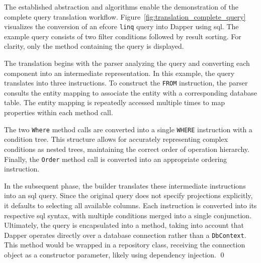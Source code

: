 \FloatBarrier
\begin{example}
\small

The established abstraction and algorithms enable the demonstration of the complete query translation workflow. Figure~\ref{fig:translation_complete_query} visualizes the conversion of an \acrshort{efcore} \texttt{linq} query into Dapper using \acrshort{sql}. The example query consists of two filter conditions followed by result sorting. For clarity, only the method containing the query is displayed. 

The translation begins with the parser analyzing the query and converting each component into an intermediate representation. In this example, the query translates into three instructions. To construct the \texttt{FROM} instruction, the parser consults the entity mapping to associate the entity with a corresponding database table. The entity mapping is repeatedly accessed multiple times to map  properties within each method call.

The two \texttt{Where} method calls are converted into a single \texttt{WHERE} instruction with a condition tree. This structure allows for accurately representing complex conditions as nested trees, maintaining the correct order of operation hierarchy. Finally, the \texttt{Order} method call is converted into an appropriate ordering instruction.

In the subsequent phase, the builder translates these intermediate instructions into an \acrshort{sql} query. Since the original query does not specify projections explicitly, it defaults to selecting all available columns. Each instruction is converted into its respective \acrshort{sql} syntax, with multiple conditions merged into a single conjunction. Ultimately, the query is encapsulated into a method, taking into account that Dapper operates directly over a database connection rather than a \texttt{DbContext}. This method would be wrapped in a repository class, receiving the connection object as a constructor parameter, likely using dependency injection. 
\qed
\end{example}

